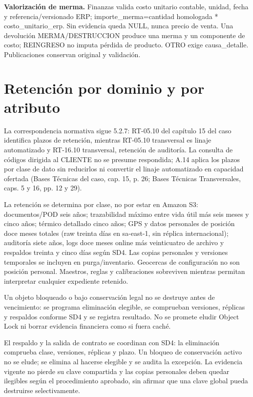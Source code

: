 \textbf{Valorización de merma.} Finanzas valida costo unitario contable, unidad, fecha y referencia/versionado ERP; importe\_merma=cantidad homologada * costo\_unitario\_erp. Sin evidencia queda NULL, nunca precio de venta. Una devolución MERMA/DESTRUCCION produce una merma y un componente de costo; REINGRESO no imputa pérdida de producto. OTRO exige causa\_detalle. Publicaciones conservan original y validación.

\section{Retención por dominio y por atributo}
\label{anexo-5d}

La correspondencia normativa sigue 5.2.7: RT-05.10 del capítulo 15 del caso identifica plazos de retención, mientras RT-05.10 transversal es linaje automatizado y RT-16.10 transversal, retención de auditoría. La consulta de códigos dirigida al CLIENTE no se presume respondida; A.14 aplica los plazos por clase de dato sin reducirlos ni convertir el linaje automatizado en capacidad ofertada (Bases Técnicas del caso, cap. 15, p. 26; Bases Técnicas Transversales, caps. 5 y 16, pp. 12 y 29).

La retención se determina por clase, no por estar en Amazon S3: documentos/POD seis años; trazabilidad máximo entre vida útil más seis meses y cinco años; térmico detallado cinco años; GPS y datos personales de posición doce meses totales (raw treinta días en sa-east-1, sin réplica internacional); auditoría siete años, logs doce meses online más veinticuatro de archivo y respaldos treinta y cinco días según SD4. Las copias personales y versiones temporales se incluyen en purga/inventario. Geocercas de configuración no son posición personal. Maestros, reglas y calibraciones sobreviven mientras permitan interpretar cualquier expediente retenido.

Un objeto bloqueado o bajo conservación legal no se destruye antes de vencimiento: se programa eliminación elegible, se comprueban versiones, réplicas y respaldos conforme SD4 y se registra resultado. No se promete eludir Object Lock ni borrar evidencia financiera como si fuera caché.


El respaldo y la salida de contrato se coordinan con SD4: la eliminación comprueba clase, versiones, réplicas y plazo. Un bloqueo de conservación activo no se elude; se elimina al hacerse elegible y se audita la excepción. La evidencia vigente no pierde su clave compartida y las copias personales deben quedar ilegibles según el procedimiento aprobado, sin afirmar que una clave global pueda destruirse selectivamente.

